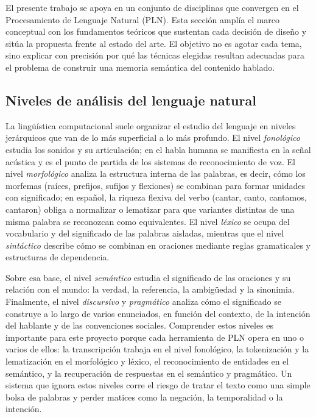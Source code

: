 \documentclass[12pt,a4paper]{article}
\begin{document}
El presente trabajo se apoya en un conjunto de disciplinas que convergen en el Procesamiento de Lenguaje Natural (PLN). Esta sección amplía el marco conceptual con los fundamentos teóricos que sustentan cada decisión de diseño y sitúa la propuesta frente al estado del arte. El objetivo no es agotar cada tema, sino explicar con precisión por qué las técnicas elegidas resultan adecuadas para el problema de construir una memoria semántica del contenido hablado.

\subsection{Niveles de análisis del lenguaje natural}

La lingüística computacional suele organizar el estudio del lenguaje en niveles jerárquicos que van de lo más superficial a lo más profundo. El nivel \emph{fonológico} estudia los sonidos y su articulación; en el habla humana se manifiesta en la señal acústica y es el punto de partida de los sistemas de reconocimiento de voz. El nivel \emph{morfológico} analiza la estructura interna de las palabras, es decir, cómo los morfemas (raíces, prefijos, sufijos y flexiones) se combinan para formar unidades con significado; en español, la riqueza flexiva del verbo (cantar, canto, cantamos, cantaron) obliga a normalizar o lematizar para que variantes distintas de una misma palabra se reconozcan como equivalentes. El nivel \emph{léxico} se ocupa del vocabulario y del significado de las palabras aisladas, mientras que el nivel \emph{sintáctico} describe cómo se combinan en oraciones mediante reglas gramaticales y estructuras de dependencia.

Sobre esa base, el nivel \emph{semántico} estudia el significado de las oraciones y su relación con el mundo: la verdad, la referencia, la ambigüedad y la sinonimia. Finalmente, el nivel \emph{discursivo} y \emph{pragmático} analiza cómo el significado se construye a lo largo de varios enunciados, en función del contexto, de la intención del hablante y de las convenciones sociales. Comprender estos niveles es importante para este proyecto porque cada herramienta de PLN opera en uno o varios de ellos: la transcripción trabaja en el nivel fonológico, la tokenización y la lematización en el morfológico y léxico, el reconocimiento de entidades en el semántico, y la recuperación de respuestas en el semántico y pragmático. Un sistema que ignora estos niveles corre el riesgo de tratar el texto como una simple bolsa de palabras y perder matices como la negación, la temporalidad o la intención.
\end{document}
